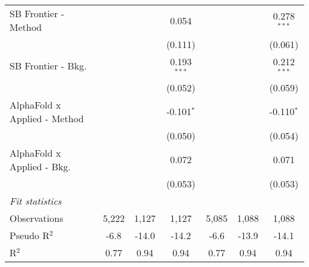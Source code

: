 \begin{tabular}{lcccccc}
   SB Frontier - Method         &                &               & 0.054         &                &               & 0.278$^{***}$\\   
                                &                &               & (0.111)       &                &               & (0.061)\\   
   SB Frontier - Bkg.           &                &               & 0.193$^{***}$ &                &               & 0.212$^{***}$\\   
                                &                &               & (0.052)       &                &               & (0.059)\\   
   AlphaFold x Applied - Method &                &               & -0.101$^{*}$  &                &               & -0.110$^{*}$\\   
                                &                &               & (0.050)       &                &               & (0.054)\\   
   AlphaFold x Applied - Bkg.   &                &               & 0.072         &                &               & 0.071\\   
                                &                &               & (0.053)       &                &               & (0.053)\\   
   \midrule
   \emph{Fit statistics}\\
   Observations                 & 5,222          & 1,127         & 1,127         & 5,085          & 1,088         & 1,088\\  
   Pseudo R$^2$                 & -6.8           & -14.0         & -14.2         & -6.6           & -13.9         & -14.1\\  
   R$^2$                        & 0.77           & 0.94          & 0.94          & 0.77           & 0.94          & 0.94\\  
   

\end{tabular}
